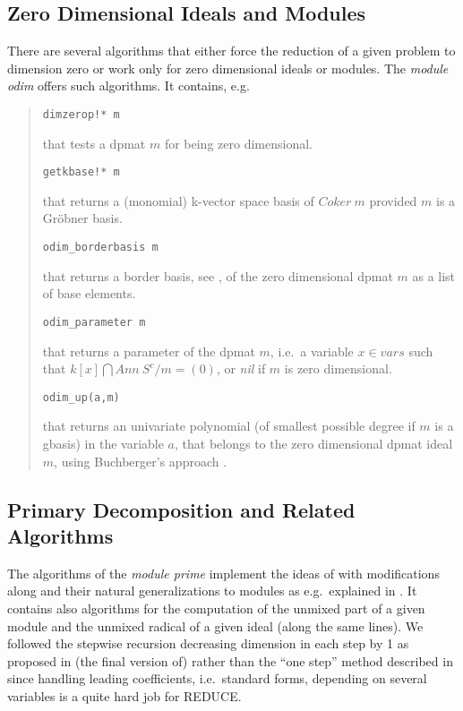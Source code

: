 \documentclass[a4paper,11pt]{article}
\newcommand{\gr}{Gr\"obner}
\newcommand{\ind}[1]{{\em #1}\index{#1}}
\newcommand{\pbx}[1]{\mbox{}\hfill \parbox[t]{12cm}{#1} \pagebreak[3]}
\begin{document}
\subsection{Zero Dimensional Ideals and Modules}

There are several algorithms that either force the reduction of a
given problem to dimension zero or work only for zero dimensional
ideals or modules.  The \ind{module odim} offers such
algorithms. It contains, e.g.\
\begin{quote}
\verb|dimzerop!* m| 

\pbx{that tests a dpmat $m$ for being zero dimensional.}

\verb|getkbase!* m| 

\pbx{that returns a (monomial) k-vector space basis of $Coker\ m$
provided $m$ is a {\gr} basis.}

\verb|odim_borderbasis m| 

\pbx{that returns a border basis, see \cite{MMM}, of the
zero dimensional dpmat $m$ as a  list of base elements.}

\verb|odim_parameter m| 

\pbx{that returns a parameter of the dpmat $m$, i.e.\ a variable $x
\in vars$ such that $k[x]\bigcap Ann\ S^c/m=(0)$, or {\em nil} if $m$
is zero dimensional.}

\verb|odim_up(a,m)| 

\pbx{that returns an univariate polynomial (of smallest possible
degree if $m$ is a gbasis) in the variable $a$, that belongs to the
zero dimensional dpmat ideal $m$, using Buchberger's approach 
\cite{B1}.} 
\end{quote}

\subsection{Primary Decomposition and Related Algorithms}

The algorithms of the \ind{module prime} implement the ideas of
\cite{GTZ} with modifications along \cite{Kr} and their natural
generalizations to modules as e.g.\ explained in \cite{Ru}. It
contains also algorithms for the computation of the unmixed part of a
given module and the unmixed radical of a given ideal (along the same
lines). We followed the stepwise recursion decreasing dimension in
each step by 1 as proposed in (the final version of) \cite{GTZ}
rather than the ``one step'' method described in \cite{BKW} since
handling leading coefficients, i.e.\ standard forms, depending on
several variables is a quite hard job for REDUCE.
\end{document}
